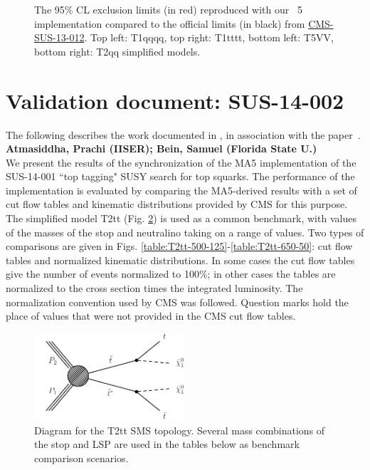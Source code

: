 \begin{figure}
\caption{The 95\% CL exclusion limits (in red) reproduced with our {}~5 implementation compared to the official limits (in black) from \href{https://twiki.cern.ch/twiki/bin/view/CMSPublic/PhysicsResultsSUS13012}{CMS-SUS-13-012}. Top left: T1qqqq, top right: T1tttt, bottom left: T5VV, bottom right: T2qq simplified models.
\label{fig:limitplots}}
        \end{figure} 
\FloatBarrier

\section{Validation document: SUS-14-002}
\label{app:ma5multijet}
The following describes the work documented in \cite{MA5-CMS-SUS-14-001}, in association with the paper~\cite{MA5-CMS-SUS-14-001}.
\textbf{Atmasiddha, Prachi (IISER); Bein, Samuel (Florida State U.)}\\
We present the results of the synchronization of the MA5
implementation of the SUS-14-001 ``top tagging" SUSY search for top squarks.  The
performance of the implementation is evaluated by comparing the
MA5-derived results with a set of cut flow tables and kinematic
distributions provided by CMS for this purpose. The simplified model
T2tt (Fig. \ref{fig:T2tt}) is used as a common benchmark, with values of the masses of the
stop and neutralino taking on a range of values. Two types of
comparisons are given in 
Figs. \ref{table:T2tt-500-125}-\ref{table:T2tt-650-50}: cut flow tables and normalized
kinematic distributions. In some cases the
cut flow tables give the number of events normalized to 100\%; in
other cases the tables are normalized to the cross section times the
integrated luminosity. The normalization convention used by CMS was
followed. Question marks hold the place of values that were not
provided in the CMS cut flow tables.
   \begin{figure}
  \centering
    \includegraphics[width=0.5\textwidth]{figures/Appendices/Ma5ValidationSUS13012/T2tt.pdf}
      \caption{Diagram for the T2tt SMS topology. Several mass
        combinations of the stop and LSP are used in the tables below
        as benchmark comparison scenarios.}
      \label{fig:T2tt}
\end{figure}


